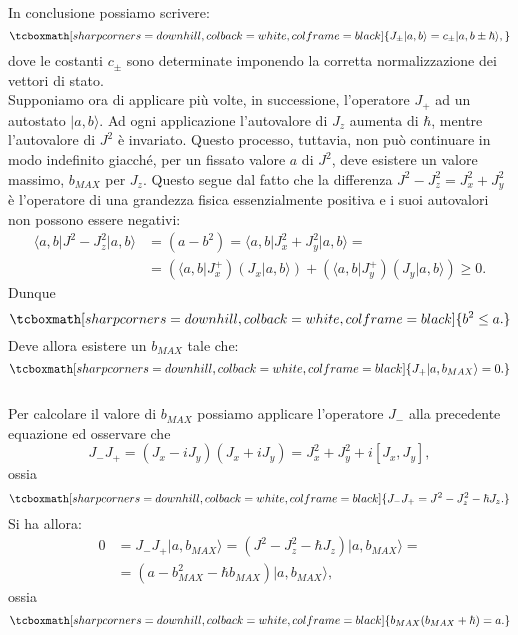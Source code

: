 In conclusione possiamo scrivere:
	\begin{equation}
		\tcboxmath[sharp corners=downhill, colback=white, colframe=black]{
			J_{\pm} \vert a, b \rangle = c_{\pm}\vert a, b\pm \hbar \rangle,
			}
	\label{eq:cap16_5}
	\end{equation}
dove le costanti $c_{\pm}$ sono determinate imponendo la corretta normalizzazione dei vettori di stato.\\

Supponiamo ora di applicare più volte, in successione, l'operatore $J_+$ ad un autostato $\vert a,b \rangle $. Ad ogni applicazione l'autovalore di $J_z$ aumenta di $\hbar$, mentre l'autovalore di $J^2$ è invariato. Questo processo, tuttavia, non può continuare in modo indefinito giacché, per un fissato valore $a$ di $J^2$, deve esistere un valore massimo, $b_{MAX}$ per $J_z$. Questo segue dal fatto che la differenza $J^2-J_z ^2=J_x ^2+J_y ^2$ è l'operatore di una grandezza fisica essenzialmente positiva e i suoi autovalori non possono essere negativi:
	\begin{align}
		\langle a,b \vert J^2-J_z ^2 \vert a, b \rangle &= (a-b^2) =  \langle a,b \vert J_x ^2+J_y ^2 \vert a, b \rangle = \nonumber \\
		&=\left(\langle a,b \vert J_x ^+\right) \left(J_x \vert a, b \rangle\right)+\left(\langle a,b \vert J_y ^+\right) \left(J_y \vert a, b \rangle\right) \geq 0.
	\end{align}
Dunque
	\begin{equation}
		\tcboxmath[sharp corners=downhill, colback=white, colframe=black]{
			b^2 \leq a .
			}
	\label{eq:cap16_6}
	\end{equation}
Deve allora esistere un $b_{MAX}$ tale che:
	\begin{equation}
		\tcboxmath[sharp corners=downhill, colback=white, colframe=black]{
			J_{+} \vert a, b_{MAX} \rangle =0.
			}
	\end{equation}\\
	
Per calcolare il valore di $b_{MAX}$ possiamo applicare l'operatore $J_-$ alla precedente equazione ed osservare che 
	\begin{equation}
		J_-J_+ = (J_x-iJ_y)(J_x+iJ_y)= J_x^2 +J_y ^2+i[J_x, J_y] ,
	\end{equation}
ossia 
	\begin{equation}
		\tcboxmath[sharp corners=downhill, colback=white, colframe=black]{
			J_-J_+ = J^2 -J_z ^2 -\hbar J_z .
			}
	\label{eq:cap16_7}
	\end{equation}
Si ha allora:
	\begin{align}
		0&=J_{-}J_{+} \vert a, b_{MAX} \rangle = (J^2 -J_z ^2 -\hbar J_z)\vert a, b_{MAX} \rangle = \nonumber \\
		&=(a- b_{MAX} ^2 - \hbar b_{MAX} )\vert a, b_{MAX} \rangle,
	\end{align}
ossia
	\begin{equation}
		\tcboxmath[sharp corners=downhill, colback=white, colframe=black]{
			b_{MAX}(b_{MAX}+\hbar) =a .
			}
	\label{eq:cap16_8}
	\end{equation}\\
	
